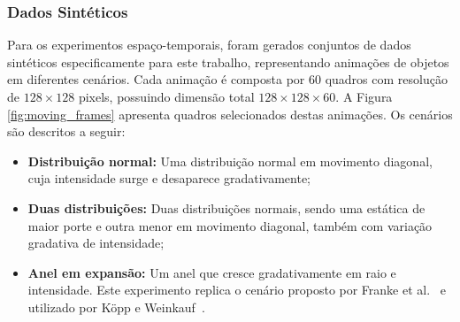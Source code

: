\documentclass[12pt]{article}
\begin{document}
\FloatBarrier
\subsubsection{Dados Sintéticos}

Para os experimentos espaço-temporais, foram gerados conjuntos de dados sintéticos especificamente para este
trabalho, representando animações de objetos em diferentes cenários. Cada animação é composta por $60$ quadros
com resolução de $128 \times 128$ pixels, possuindo dimensão total $128 \times 128 \times 60$. A Figura \ref{fig:moving_frames} apresenta
quadros selecionados destas animações. Os cenários são descritos a seguir:

\begin{itemize}
  \item \textbf{Distribuição normal:} Uma distribuição normal em movimento diagonal, cuja intensidade surge e desaparece gradativamente;
  \item \textbf{Duas distribuições:} Duas distribuições normais, sendo uma estática de maior porte e outra menor em movimento diagonal, também com variação gradativa de intensidade;
  \item \textbf{Anel em expansão:} Um anel que cresce gradativamente em raio e intensidade. Este experimento replica o cenário proposto por Franke et al.~\cite{franke:21} e utilizado por Köpp e Weinkauf~\cite{KoeppWeinkauf2022_TMTM}.
\end{itemize}
\end{document}

